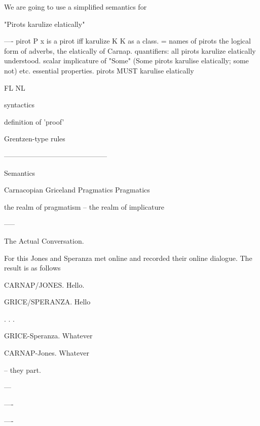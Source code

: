 \documentclass[10pt,titlepage]{book}
\begin{document}
{ 
 
 We are going to use a simplified semantics for
 
         "Pirots karulize  elatically"
 
---- pirot P  x is a pirot iff
    karulize K   K as  a class. = 
    names of pirots
    the logical form of adverbs, the elatically of  Carnap.
    quantifiers: all pirots karulize elatically  understood.
          scalar implicature  of "Some" (Some pirots karulise elatically; 
some not)
    etc.
    essential properties.
        pirots MUST karulise  elatically
 
 
 
          FL                                          NL
 
 
                  syntactics
 
                 
 
                definition of 'proof'
 
                
              
                 Grentzen-type rules
 
 
           --------------------------------------------
 
                   Semantics
 
 
Carnacopian                        Griceland
Pragmatics                       Pragmatics
 
the realm 
of 
pragmatism                                -- the realm of implicature
 
 
 
 
-----
 
The Actual Conversation.
 
For this Jones and Speranza
met online and recorded their online
dialogue. The result is as follows
 
 
CARNAP/JONES. Hello.
 
GRICE/SPERANZA. Hello
 
.
.
.
 
 
 
 
 
GRICE-Speranza. Whatever
 
CARNAP-Jones. Whatever
 
             --  they part.
 
---
 
----
 
 
----
 
}
\end{document}
